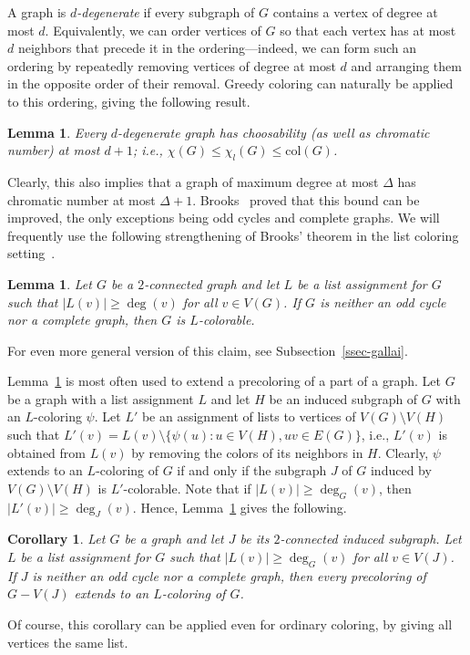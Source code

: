 \documentclass[12pt,twoside,openright,a4paper]{book}
\newtheorem{lemma}[theorem]{Lemma}
\newtheorem{corollary}[theorem]{Corollary}
\newcommand{\col}{\text{col}}
\begin{document}
A graph is \emph{$d$-degenerate} if every subgraph of $G$ contains a vertex of degree at most $d$.
Equivalently, we can order vertices of $G$ so that each vertex has at most $d$ neighbors that precede it in the
ordering---indeed, we can form such an ordering by repeatedly removing vertices of degree at most $d$ and
arranging them in the opposite order of their removal.
Greedy coloring can naturally be applied to this ordering, giving the following result.
\begin{lemma}\label{lemma:degen}
Every $d$-degenerate graph has choosability (as well as chromatic number) at most $d+1$; i.e., $\chi(G)\le\chi_l(G)\le \col(G)$.
\end{lemma}

Clearly, this also implies that a graph of maximum degree at most $\Delta$ has chromatic number
at most $\Delta+1$.  Brooks~\cite{brooks1941colouring} proved that this bound can be improved, the only exceptions
being odd cycles and complete graphs.  We will frequently use the following strengthening of Brooks' theorem
in the list coloring setting~\cite{galfor}.
\begin{lemma}\label{lemma:gallai1}
Let $G$ be a $2$-connected graph and let $L$ be a list assignment for $G$ such that $|L(v)|\ge \deg(v)$ for all $v\in V(G)$.
If $G$ is neither an odd cycle nor a complete graph, then $G$ is $L$-colorable.
\end{lemma}
For even more general version of this claim, see Subsection~\ref{ssec-gallai}.

Lemma~\ref{lemma:gallai1} is most often used to extend a precoloring of a part of a graph.
Let $G$ be a graph with a list assignment $L$ and let $H$ be an induced subgraph of $G$ with an $L$-coloring $\psi$.
Let $L'$ be an assignment of lists to vertices of $V(G)\setminus V(H)$ such that $L'(v)=L(v)\setminus \{\psi(u):u\in V(H),uv\in E(G)\}$,
i.e., $L'(v)$ is obtained from $L(v)$ by removing the colors of its neighbors in $H$.  Clearly, $\psi$ extends to an $L$-coloring of $G$
if and only if the subgraph $J$ of $G$ induced by $V(G)\setminus V(H)$ is $L'$-colorable.  Note that if $|L(v)|\ge \deg_G(v)$, then
$|L'(v)|\ge \deg_J(v)$.  Hence, Lemma~\ref{lemma:gallai1} gives the following.
\begin{corollary}\label{cor:gallai1}
Let $G$ be a graph and let $J$ be its $2$-connected induced subgraph.  Let $L$ be a list assignment for $G$ such that $|L(v)|\ge \deg_G(v)$ for all $v\in V(J)$.
If $J$ is neither an odd cycle nor a complete graph, then every precoloring of $G-V(J)$ extends to an $L$-coloring of $G$.
\end{corollary}
Of course, this corollary can be applied even for ordinary coloring, by giving all vertices the same list.
\end{document}
